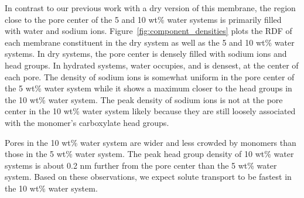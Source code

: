 \documentclass[journal=jpcbfk,manuscript=article]{achemso}
\begin{document}
  In contrast to our previous work with a dry version of this membrane, the 
  region close to the pore center of the 5 and 10 wt\% water systems is 
  primarily filled with water and sodium ions. Figure~\ref{fig:component_densities}
  plots the RDF of each membrane constituent in the dry system as well as the
  5 and 10 wt\% water systems. In dry systems, the pore center is densely 
  filled with sodium ions and head groups. In hydrated systems, water occupies, 
  and is densest, at the center of each pore. The density of sodium ions is 
  somewhat uniform in the pore center of the 5 wt\% water system while it shows
  a maximum closer to the head groups in the 10 wt\% water system. The peak 
  density of sodium ions is not at the pore center in the 10 wt\% water system
  likely because they are still loosely associated with the monomer's carboxylate
  head groups.
  
  Pores in the 10 wt\% water system are wider and less crowded by monomers than
  those in the 5 wt\% water system. The peak head group density of 10 wt\% water
  systems is about 0.2 nm further from the pore center than the 5 wt\% water system. 
  Based on these observations, we expect solute transport to be fastest in the 
  10 wt\% water system.
  
\end{document}

